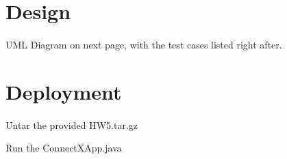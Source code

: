 \documentclass{article}
\begin{document}
\section{Design}
\paragraph{}
UML Diagram on next page, with the test cases listed right after.    




\section{Deployment}
\paragraph{}
Untar the provided HW5.tar.gz

Run the ConnectXApp.java
\end{document}
